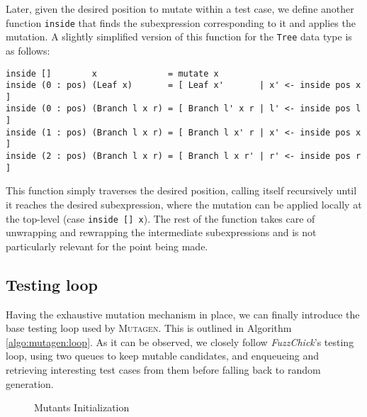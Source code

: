\documentclass[acmsmall, anonymous]{acmart}
\newcommand{\fuzzchick}{\textit{FuzzChick}\xspace}
\newcommand{\mutagen}{\textsc{Mutagen}\xspace}
\begin{document}
\noindent Later, given the desired position to mutate within a test case, we
define another function \texttt{inside} that finds the subexpression
corresponding to it and applies the mutation.
%
A slightly simplified version of this function for the \texttt{Tree} data type is
as follows:

\begin{verbatim}
inside []        x              = mutate x
inside (0 : pos) (Leaf x)       = [ Leaf x'       | x' <- inside pos x ]
inside (0 : pos) (Branch l x r) = [ Branch l' x r | l' <- inside pos l ]
inside (1 : pos) (Branch l x r) = [ Branch l x' r | x' <- inside pos x ]
inside (2 : pos) (Branch l x r) = [ Branch l x r' | r' <- inside pos r ]
\end{verbatim}

\noindent This function simply traverses the desired position, calling itself
recursively until it reaches the desired subexpression, where the mutation can
be applied locally at the top-level (case \texttt{inside [] x}).
%
The rest of the function takes care of unwrapping and rewrapping the
intermediate subexpressions and is not particularly relevant for the point being
made.


\subsection{Testing loop}

Having the exhaustive mutation mechanism in place, we can finally introduce the
base testing loop used by \mutagen.
%
This is outlined in Algorithm \ref{algo:mutagen:loop}.
%
As it can be observed, we closely follow \fuzzchick's testing loop, using two
queues to keep mutable candidates, and enqueueing and retrieving interesting
test cases from them before falling back to random generation.

\begin{wrapfigure}{r}{0.5\textwidth}
\vspace{-10pt}
\begin{algorithm}[H]
  \SetInd{0em}{0.75em}
  \SetAlgoLined
  \DontPrintSemicolon
\caption{\label{algo:mutagen:init}Mutants Initialization}
\end{algorithm}
\vspace{-10pt}
\end{wrapfigure}
\end{document}
